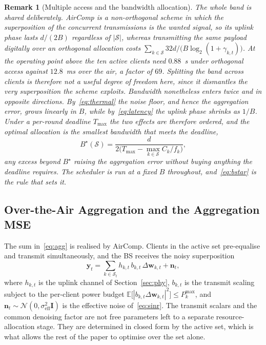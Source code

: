 \documentclass[lettersize,journal]{IEEEtran}
\newtheorem{remark}{Remark}
\newcommand{\bw}{\bm{w}}
\newcommand{\calS}{\mathcal{S}}
\begin{document}
\begin{remark}[Multiple access and the bandwidth allocation]\label{rem:mac}
The whole band is shared deliberately. AirComp is a non-orthogonal scheme in which the superposition of the concurrent transmissions \emph{is} the wanted signal, so its uplink phase lasts $d/(2B)$ regardless of $|\calS|$, whereas transmitting the same payload digitally over an orthogonal allocation costs $\sum_{k\in\calS}32d/\big(B\log_{2}(1+\gamma_{k,t})\big)$. At the operating point above the ten active clients need $0.88$~s under orthogonal access against $12.8$~ms over the air, a factor of $69$. Splitting the band across clients is therefore not a useful degree of freedom here, since it dismantles the very superposition the scheme exploits. Bandwidth nonetheless enters twice and in opposite directions. By~\eqref{eq:thermal} the noise floor, and hence the aggregation error, grows linearly in $B$, while by~\eqref{eq:latency} the uplink phase shrinks as $1/B$. Under a per-round deadline $T_{\max}$ the two effects are therefore ordered, and the optimal allocation is the smallest bandwidth that meets the deadline,
\begin{equation}
B^{\star}(\calS)=\frac{d}{2\big(T_{\max}-\max_{k\in\calS}C_{k}/f_{k}\big)},
\label{eq:bstar}
\end{equation}
any excess beyond $B^{\star}$ raising the aggregation error without buying anything the deadline requires. The scheduler is run at a fixed $B$ throughout, and~\eqref{eq:bstar} is the rule that sets it.
\end{remark}

\subsection{Over-the-Air Aggregation and the Aggregation MSE}
The sum in~\eqref{eq:agg} is realised by AirComp. Clients in the active set pre-equalise and transmit simultaneously, and the BS receives the noisy superposition
\begin{equation}
\bm{y}_t=\sum_{k\in\calS_t} h_{k,t}\,b_{k,t}\,\Delta\bw_{k,t}+\bm{n}_t,
\label{eq:aircomp}
\end{equation}
where $h_{k,t}$ is the uplink channel of Section~\ref{sec:phy}, $b_{k,t}$ is the transmit scaling subject to the per-client power budget $\mathbb{E}\big[|b_{k,t}\Delta\bw_{k,t}|^{2}\big]\le P^{\max}_{k}$, and $\bm{n}_t\sim\mathcal{N}(0,\sigma^{2}_{\mathrm{eff}}\bm{I})$ is the effective noise of~\eqref{eq:sinr}. The transmit scalars and the common denoising factor are not free parameters left to a separate resource-allocation stage. They are determined in closed form by the active set, which is what allows the rest of the paper to optimise over the set alone.
\end{document}
